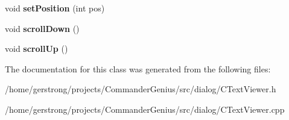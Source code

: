\begin{DoxyCompactItemize}
\item 
\hypertarget{class_c_text_viewer_a94e86d4926299e8a72f55706b2b6b3c4}{
void {\bfseries setPosition} (int pos)}
\label{class_c_text_viewer_a94e86d4926299e8a72f55706b2b6b3c4}

\item 
\hypertarget{class_c_text_viewer_a6480bea026c1ad277dfe51ef341b9f60}{
void {\bfseries scrollDown} ()}
\label{class_c_text_viewer_a6480bea026c1ad277dfe51ef341b9f60}

\item 
\hypertarget{class_c_text_viewer_ab5124078694ceb2b50d6724c56cac6cd}{
void {\bfseries scrollUp} ()}
\label{class_c_text_viewer_ab5124078694ceb2b50d6724c56cac6cd}

\end{DoxyCompactItemize}


The documentation for this class was generated from the following files:\begin{DoxyCompactItemize}
\item 
/home/gerstrong/projects/CommanderGenius/src/dialog/CTextViewer.h\item 
/home/gerstrong/projects/CommanderGenius/src/dialog/CTextViewer.cpp\end{DoxyCompactItemize}
